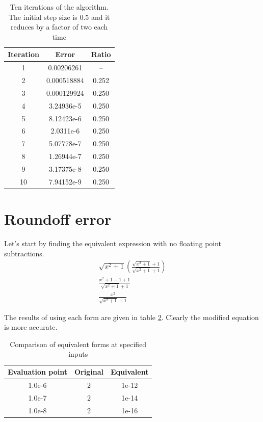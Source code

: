 \documentclass[12pt, letterpaper]{article}
\begin{document}
\begin{table}[!b]
    \centering
    \caption{Ten iterations of the algorithm. The initial step size is 0.5 and
        it reduces by a factor of two each time}
    \label{tab:converge}
    \begin{tabular}{ c c c }
    \hline\hline
    Iteration & Error & Ratio\\
    \hline
    1 & 0.00206261 & -- \\
    2 & 0.000518884 & 0.252 \\
    3 & 0.000129924 & 0.250 \\
    4 & 3.24936e-5 & 0.250 \\
    5 & 8.12423e-6 & 0.250 \\
    6 & 2.0311e-6 & 0.250 \\
    7 & 5.07778e-7 & 0.250 \\
    8 & 1.26944e-7 & 0.250 \\
    9 & 3.17375e-8 & 0.250 \\
    10 & 7.94152e-9 & 0.250 \\
    \hline\hline
    \end{tabular}
\end{table}

\section{Roundoff error}
Let's start by finding the equivalent expression with no floating point
subtractions.
\begin{gather}
    \sqrt{x^2 + 1} \left( \frac{\sqrt{x^2 + 1} + 1}{\sqrt{x^2 + 1} + 1} \right)
    \\
    \frac{x^2 + 1 - 1 + 1}{\sqrt{x^2 + 1} + 1}
    \\
    \frac{x^2}{\sqrt{x^2 + 1} + 1}
\end{gather}

The results of using each form are given in table \ref{tab:roundoff}. Clearly
the modified equation is more accurate.

\begin{table}[h]
  \centering
  \caption{Comparison of equivalent forms at specified inputs}
  \label{tab:roundoff}
  \begin{tabular} { c c c }
    \hline\hline
    Evaluation point & Original & Equivalent \\
    \hline
    1.0e-6 & 2 & 1e-12 \\
    1.0e-7 & 2 & 1e-14 \\
    1.0e-8 & 2 & 1e-16 \\
    \hline\hline
  \end{tabular}
\end{table}
\end{document}
